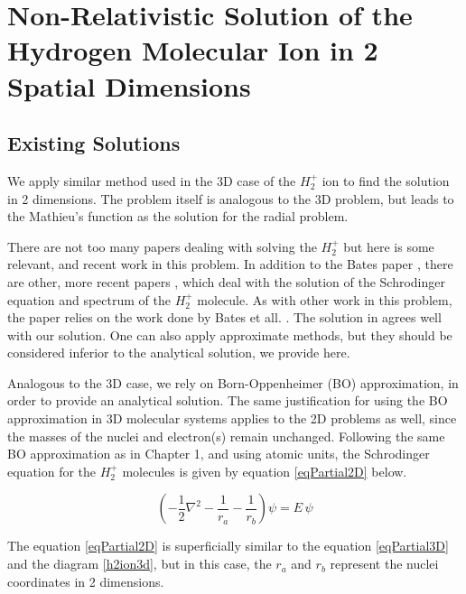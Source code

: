 \chapter{Non-Relativistic Solution of the Hydrogen Molecular Ion in 2 Spatial Dimensions}

\section{Existing Solutions}

We apply similar method used in the 3D case of the $ H_2^{+} $ ion to find the solution in 2 dimensions. The problem itself is analogous to the 3D problem, but leads to the Mathieu's function as the solution for the radial problem.

There are not too many papers dealing with solving the $ H_2^{+} $ but here is some relevant, and recent work in this problem. In addition to the Bates paper \cite{Bates1}, there are other, more recent papers \cite{H2Plus2d1} \cite{TwoCentersParticle}, \cite{Kolos} which deal with the solution of the Schrodinger equation and spectrum of the $ H_2^{+} $ molecule.  As with other work in this problem, the paper relies on the work done by Bates et all. \cite{Bates1}. The solution in \cite{H2Plus2d1} agrees well with our solution.  One can also apply approximate methods, but they should be considered inferior to the analytical solution, we provide here. 

Analogous to the 3D case, we rely on Born-Oppenheimer (BO) approximation, in order to provide an analytical solution. The same justification for using the BO approximation in 3D molecular systems applies to the 2D problems as well, since the masses of the nuclei and electron(s) remain unchanged.  Following the same BO approximation as in Chapter 1, and using atomic units, the Schrodinger equation for the $ H_2^{+} $ molecules is given by equation \eqref{eqPartial2D} below. 


\begin{equation}\label{eqPartial2D}
\left(-\frac{1}{2}\nabla^2-\frac{1}{r_a}-\frac{1}{r_b}\right)\psi = E\,\psi
\end{equation}

The equation \eqref{eqPartial2D} is superficially similar to the equation \eqref{eqPartial3D} and the diagram \ref{h2ion3d}, but in this case, the $ r_a $ and $ r_b $ represent the nuclei coordinates in 2 dimensions.

